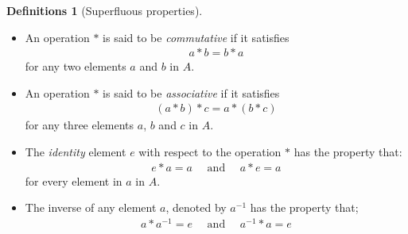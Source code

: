 \documentclass[nohyper,nobib]{tufte-handout}
\theoremstyle{definition}
\newtheorem{defns}[thm]{Definitions}
\theoremstyle{remark}
\begin{document}
\begin{defns}[Superfluous properties]

    \begin{itemize}
        \item An operation $*$ is said to be \emph{commutative} if it satisfies
            \begin{align}
                a * b  = b * a
            \end{align}
            for any two elements $a$ and $b$ in $A$.
        \item An operation $*$ is said to be \emph{associative} if it satisfies 
            \begin{align}
                (a * b) * c = a * (b * c)
            \end{align}
            for any three elements $a$, $b$ and $c$ in $A$.
        \item The \emph{identity} element $e$ with respect to the operation $*$ has the property that:
            \begin{align}
                e * a  = a \quad\text{ and }\quad a * e = a
            \end{align}
            for every element in $a$ in $A$.
        \item The inverse of any element $a$, denoted by $a^{-1}$ has the property that;
            \begin{align}
                a * a^{-1} = e  \quad\text{ and }\quad a^{-1} * a = e
            \end{align}
    \end{itemize}
\end{defns}
\end{document}
